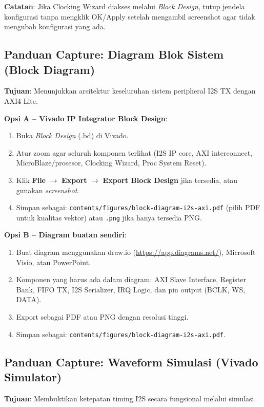 \textbf{Catatan}: Jika Clocking Wizard diakses melalui \textit{Block Design}, tutup jendela konfigurasi tanpa mengklik OK/Apply setelah mengambil screenshot agar tidak mengubah konfigurasi yang ada.

\subsection{Panduan Capture: Diagram Blok Sistem (Block Diagram)}

\textbf{Tujuan}: Menunjukkan arsitektur keseluruhan sistem peripheral I2S TX dengan AXI4-Lite.

\textbf{Opsi A -- Vivado IP Integrator Block Design}:
\begin{enumerate}
    \item Buka \textit{Block Design} (.bd) di Vivado.
    \item Atur zoom agar seluruh komponen terlihat (I2S IP core, AXI interconnect, MicroBlaze/prosesor, Clocking Wizard, Proc System Reset).
    \item Klik \textbf{File} $\rightarrow$ \textbf{Export} $\rightarrow$ \textbf{Export Block Design} jika tersedia, atau gunakan \textit{screenshot}.
    \item Simpan sebagai: \texttt{contents/figures/block-diagram-i2s-axi.pdf} (pilih PDF untuk kualitas vektor) atau \texttt{.png} jika hanya tersedia PNG.
\end{enumerate}

\textbf{Opsi B -- Diagram buatan sendiri}:
\begin{enumerate}
    \item Buat diagram menggunakan draw.io (\url{https://app.diagrams.net/}), Microsoft Visio, atau PowerPoint.
    \item Komponen yang harus ada dalam diagram: AXI Slave Interface, Register Bank, FIFO TX, I2S Serializer, IRQ Logic, dan pin output (BCLK, WS, DATA).
    \item Export sebagai PDF atau PNG dengan resolusi tinggi.
    \item Simpan sebagai: \texttt{contents/figures/block-diagram-i2s-axi.pdf}.
\end{enumerate}

\subsection{Panduan Capture: Waveform Simulasi (Vivado Simulator)}

\textbf{Tujuan}: Membuktikan ketepatan timing I2S secara fungsional melalui simulasi.

